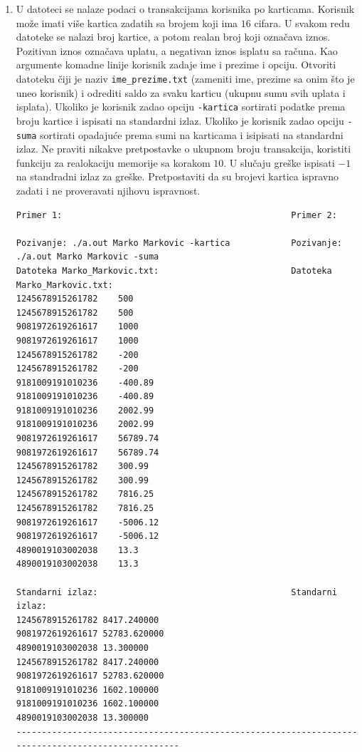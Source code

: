 \begin{enumerate} 
\item U datoteci se nalaze podaci o transakcijama korisnika po karticama. Korisnik može imati više 
      kartica zadatih sa brojem koji ima $16$ cifara. U svakom redu datoteke se nalazi broj kartice,
      a potom realan broj koji označava iznos. Pozitivan iznos označava uplatu, a negativan iznos isplatu sa računa.
      Kao argumente komadne linije korisnik zadaje ime i prezime i opciju. Otvoriti datoteku čiji je naziv {\tt ime\_prezime.txt}
      (zameniti ime, prezime sa onim što je uneo korisnik) i odrediti saldo za svaku karticu (ukupnu sumu svih uplata i isplata).
      Ukoliko je korisnik zadao opciju {\tt -kartica} sortirati podatke prema broju kartice i ispisati na standardni izlaz.
      Ukoliko je korisnik zadao opciju {\tt -suma} sortirati opadajuće prema sumi na karticama i isipisati na standardni izlaz.
      Ne praviti nikakve pretpostavke o ukupnom broju transakcija, koristiti funkciju za realokaciju memorije sa korakom $10$. 
      U slučaju greške ispisati $-1$ na standradni izlaz za greške. Pretpostaviti da su brojevi kartica ispravno zadati i ne 
      proveravati njihovu ispravnost.

\begin{verbatim}
Primer 1:                                             Primer 2:

Pozivanje: ./a.out Marko Markovic -kartica            Pozivanje: ./a.out Marko Markovic -suma
Datoteka Marko_Markovic.txt:                          Datoteka Marko_Markovic.txt:
1245678915261782    500                               1245678915261782    500
9081972619261617    1000                              9081972619261617    1000
1245678915261782    -200                              1245678915261782    -200
9181009191010236    -400.89                           9181009191010236    -400.89
9181009191010236    2002.99                           9181009191010236    2002.99
9081972619261617    56789.74                          9081972619261617    56789.74
1245678915261782    300.99                            1245678915261782    300.99
1245678915261782    7816.25                           1245678915261782    7816.25
9081972619261617    -5006.12                          9081972619261617    -5006.12
4890019103002038    13.3                              4890019103002038    13.3         

Standarni izlaz:                                      Standarni izlaz:
1245678915261782 8417.240000                          9081972619261617 52783.620000
4890019103002038 13.300000                            1245678915261782 8417.240000
9081972619261617 52783.620000                         9181009191010236 1602.100000
9181009191010236 1602.100000                          4890019103002038 13.300000
---------------------------------------------------------------------------------------------------


\end{verbatim}
\end{enumerate}
